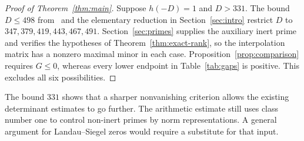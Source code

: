 \begin{proof}[Proof of Theorem~\ref{thm:main}]
Suppose $h(-D)=1$ and $D>331$. The bound $D\leq498$ from~\cite{chung498}
and the elementary reduction in Section~\ref{sec:intro} restrict $D$ to
$347,379,419,443,467,491$. Section~\ref{sec:primes} supplies the
auxiliary inert prime and verifies the hypotheses of
Theorem~\ref{thm:exact-rank}, so the interpolation matrix has a nonzero
maximal minor in each case. Proposition~\ref{prop:comparison} requires
$G\leq0$, whereas every lower endpoint in Table~\ref{tab:gaps} is positive.
This excludes all six possibilities.
\end{proof}

The bound $331$ shows that a sharper nonvanishing criterion allows the
existing determinant estimates to go further. The arithmetic estimate
still uses class number one to control non-inert primes by norm
representations. A general argument for Landau--Siegel zeros would
require a substitute for that input.
